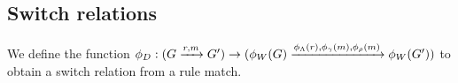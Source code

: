 \subsection{Switch relations}
We define the function $\phi_D: (G \xrightarrow{r, m} G') \rightarrow (\phi_W(G)\xrightarrow{\phi_\Lambda(r), \phi_\gamma(m), \phi_\rho(m)}\phi_W(G'))$ to obtain a switch relation from a rule match. 

